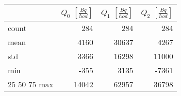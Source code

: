 \begin{tabular}{lrrr}
\toprule
{} &  $Q_0$ $\left[\si{\frac{Bq}{hod}}\right]$ &  $Q_1$ $\left[\si{\frac{Bq}{hod}}\right]$ &  $Q_2$ $\left[\si{\frac{Bq}{hod}}\right]$ \\
\midrule
count &                                       284 &                                       284 &                                       284 \\
mean  &                                      4160 &                                     30637 &                                      4267 \\
std   &                                      3366 &                                     16298 &                                     11000 \\
min   &                                      -355 &                                      3135 &                                     -7361 \\
25%
50%
75%
max   &                                     14042 &                                     62957 &                                     36798 \\
\bottomrule
\end{tabular}
